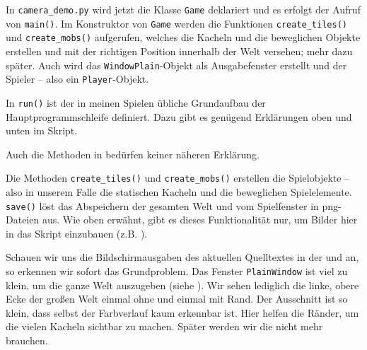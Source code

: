 
In \texttt{camera\_demo.py} wird jetzt die Klasse \texttt{Game} deklariert und es erfolgt der Aufruf von \texttt{main()}. Im Konstruktor von \texttt{Game} werden die Funktionen \texttt{create\_tiles()} und \texttt{create\_mobs()} aufgerufen, welches die Kacheln und die beweglichen Objekte erstellen und mit der richtigen Position innerhalb der Welt versehen; mehr dazu später. Auch wird das \texttt{WindowPlain}-Objekt als Ausgabefenster erstellt und der Spieler -- also ein \texttt{Player}-Objekt. 

In \texttt{run()} ist der in meinen Spielen übliche Grundaufbau der Hauptprogrammschleife definiert. Dazu gibt es genügend Erklärungen oben und unten im Skript.


Auch die Methoden in  bedürfen keiner näheren Erklärung. 


Die Methoden \texttt{create\_tiles()} und \texttt{create\_mobs()} erstellen die Spielobjekte -- also in unserem Falle die statischen Kacheln und die beweglichen Spielelemente. \texttt{save()} löst das Abspeichern der gesamten Welt und vom Spielfenster in png-Dateien aus. Wie oben erwähnt, gibt es dieses Funktionalität nur, um Bilder hier in das Skript einzubauen (z.B. ).




Schauen wir uns die Bildschirmausgaben des aktuellen Quelltextes  in der  und  an, so erkennen wir sofort das Grundproblem. Das Fenster \texttt{Plain\-Wind\-ow} ist viel zu klein, um die ganze Welt auszugeben (siehe ). Wir sehen lediglich die linke, obere Ecke der großen Welt einmal ohne und einmal mit Rand. Der Ausschnitt ist so klein, dass selbst der Farbverlauf kaum erkennbar ist. Hier helfen die Ränder, um die vielen Kacheln sichtbar zu machen. Später werden wir die nicht mehr brauchen.

